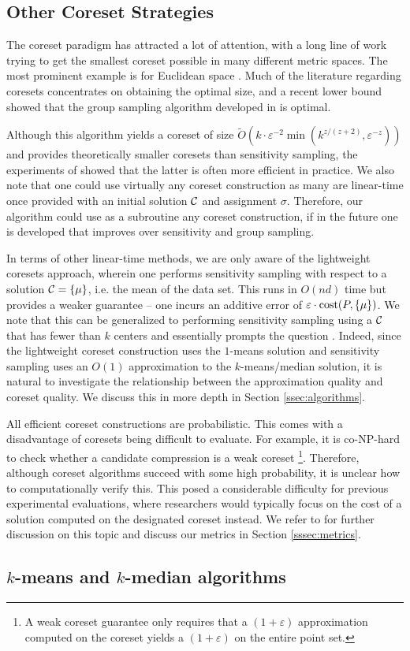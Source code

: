 \subsection{Other Coreset Strategies}
\label{ssec:clustering_prelim}

The coreset paradigm has attracted a lot of attention, with a long line of work trying to get the smallest coreset possible in many different metric spaces. The
most prominent example is for Euclidean space \cite{BadoiuHI02, HaM04, Chen09, HuangV20, stoc22}. Much of the literature regarding coresets concentrates on obtaining the optimal size, and a recent lower bound \cite{huangLB} showed that the group sampling algorithm developed in \cite{stoc21, stoc22} is optimal.

Although this algorithm yields a coreset of size $\tilde{O}(k\cdot \varepsilon^{-2}
\min(k^{z/(z+2)},\varepsilon^{-z}))$ \cite{CLSSS22} and provides theoretically smaller coresets than sensitivity sampling, the experiments of \cite{chrisESA}
showed that the latter is often more efficient in practice. We also note that one could use virtually any coreset construction as many are linear-time once
provided with an initial solution $\mathcal C$ and assignment $\sigma$.  Therefore, our algorithm could use as a subroutine any coreset construction, if in the
future one is developed that improves over sensitivity and group sampling.

In terms of other linear-time methods, we are only aware of the lightweight coresets approach\cite{BachemL018}, wherein one performs sensitivity sampling with
respect to a solution $\mathcal C=\{\mu\}$, i.e. the mean of the data set. This runs in $O(nd)$ time but provides a weaker guarantee -- one incurs an additive error
of $\varepsilon\cdot \operatorname{cost}(P,\{\mu\})$.  We note that this can be generalized to performing sensitivity sampling using a $\mathcal C$ that has fewer than $k$ centers
and essentially prompts the question .  Indeed, since the lightweight coreset construction uses the $1$-means solution and sensitivity sampling uses an $O(1)$
approximation to the $k$-means/median solution, it is natural to investigate the relationship between the approximation quality and coreset quality. We discuss
this in more depth in Section \ref{ssec:algorithms}.

All efficient coreset constructions are probabilistic. This comes with a disadvantage of coresets being difficult to evaluate. For example, it is
co-NP-hard to check whether a candidate compression is a weak coreset \cite{chrisESA} \footnote{A weak coreset guarantee only requires that a $(1+\varepsilon)$
approximation computed on the coreset yields a $(1+\varepsilon)$ on the entire point set.}. Therefore, although coreset algorithms succeed with some high
probability, it is unclear how to computationally verify this.  This posed a considerable difficulty for previous experimental evaluations,
where researchers would typically focus on the cost of a solution computed on the designated coreset instead. We refer to \cite{chrisESA} for further discussion
on this topic and discuss our metrics in Section \ref{sssec:metrics}.

\subsection{$k$-means and $k$-median algorithms}
